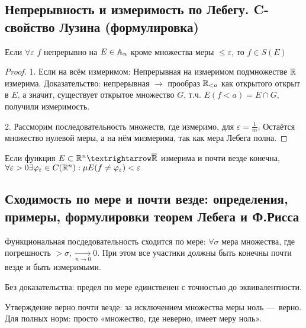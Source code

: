 \documentclass[12pt, a4paper, oneside]{memoir}
\begin{document}
\subsection{Непрерывность и измеримость по Лебегу. C-свойство Лузина (формулировка)}

\begin{theorem}

    Если $\forall \varepsilon$ $f$ непрерывно на $E \in {\mathbb{A}}_n$ кроме множества меры $\leqslant \varepsilon$, то $f \in S(E)$

    \begin{proof}
        1. Если на всём измеримом: Непрерывная на измеримом подмножестве ${\mathbb{R}}$ измерима.
        Доказательство: непрерывная $→$ прообраз ${\mathbb{R}}_{< a}$ как открытого открыт в $E$, 
        а значит, существует открытое множество $G$, т.ч. $E(f < a) = E \cap G$, получили измеримость.

        2. Рассморим последовательность множеств, где измеримо, для $\varepsilon = \frac{1}{m}$. Остаётся множество нулевой меры, 
        а на нём мизмерима, так как мера Лебега полна.
    \end{proof}
\end{theorem}

\begin{theorem}

    Если функция $E \subset \sR^n → \overline{\sR}$ измерима и почти везде конечна,
    $\forall \varepsilon > 0 \exists \varphi_\varepsilon \in C({\mathbb{R}}^n): \mu E (f \neq \varphi_\varepsilon) < \varepsilon$ 
\end{theorem}


\subsection{Сходимость по мере и почти везде: определения, примеры, 
формулировки теорем Лебега и Ф.Рисса}

Функциональная посдедовательность сходится по мере:
$\forall \sigma$ мера множества, где погрешность 
$> \sigma, \underset{n → 0}{\longrightarrow} 0$. При этом все участнки должны быть конечны почти везде и быть измеримыми.

Без доказательства: предел по мере единственен с точностью до эквивалентности.

Утверждение верно почти везде: за исключением множества меры ноль — верно.
Для полных норм: просто «множество, где неверно, имеет меру ноль».
\end{document}
